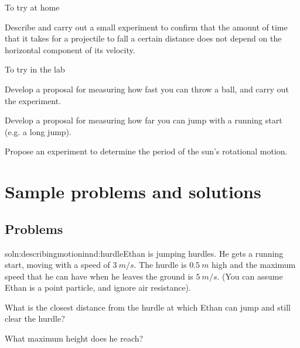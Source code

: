 \begin{chapteractivity}{To try at home}
{
\item Describe and carry out a small experiment to confirm that the amount of time that it takes for a projectile to fall a certain distance does not depend on the horizontal component of its velocity.
}
\end{chapteractivity}


\begin{chapteractivity}{To try in the lab}
{
\item Develop a proposal for measuring how fast you can throw a ball, and carry out the experiment.
\item Develop a proposal for measuring how far you can jump with a running start (e.g. a long jump).
\item Propose an experiment to determine the period of the sun's rotational motion.
}
\end{chapteractivity}

\newpage
\section{Sample problems and solutions}
\subsection{Problems}
\begin{problemParts}{soln:describingmotioninnd:hurdle}{\label{prob:describingmotioninnd:hurdle}Ethan is jumping hurdles. He gets a running start, moving with a speed of $\SI{3}{m/s}$. The hurdle is $\SI{0.5}{m}$ high and the maximum speed that he can have when he leaves the ground is $\SI{5}{m/s}$. (You can assume Ethan is a point particle, and ignore air resistance).}
\item What is the closest distance from the hurdle at which Ethan can jump and still clear the hurdle?
\item What maximum height does he reach?
\end{problemParts}

